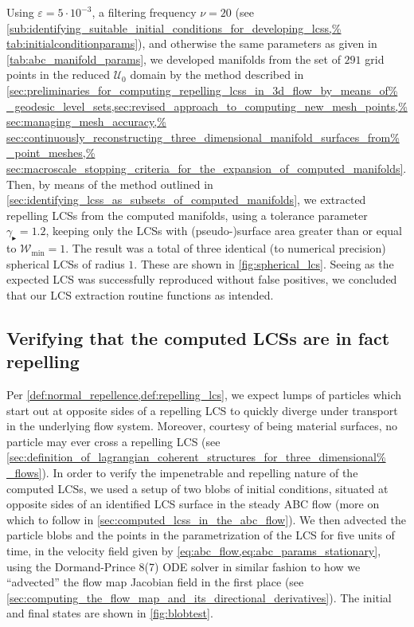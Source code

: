 

Using $\varepsilon=5\cdot10^{-3}$, a filtering frequency $\nu=20$ (see
\cref{sub:identifying_suitable_initial_conditions_for_developing_lcss,%
tab:initialconditionparams}), and otherwise the same parameters as given
in \cref{tab:abc_manifold_params}, we developed manifolds from the set
of $291$ grid points in the reduced $\mathcal{U}_{0}$ domain by the method
described in
\cref{sec:preliminaries_for_computing_repelling_lcss_in_3d_flow_by_means_of%
    _geodesic_level_sets,sec:revised_approach_to_computing_new_mesh_points,%
    sec:managing_mesh_accuracy,%
    sec:continuously_reconstructing_three_dimensional_manifold_surfaces_from%
    _point_meshes,%
    sec:macroscale_stopping_criteria_for_the_expansion_of_computed_manifolds}.
Then, by means of the method outlined in
\cref{sec:identifying_lcss_as_subsets_of_computed_manifolds}, we extracted
repelling LCSs from the computed manifolds, using a tolerance parameter
$\gamma_{\blacktriangleright}=1.2$, keeping only the LCSs with (pseudo-)surface
area greater than or equal to $\mathcal{W}_{\min}=1$. The result was a total of
three identical (to numerical precision) spherical LCSs of radius $1$. These
are shown in \cref{fig:spherical_lcs}. Seeing as the expected LCS was
successfully reproduced without false positives, we concluded that our LCS
extraction routine functions as intended.




\subsection{Verifying that the computed LCSs are in fact repelling}
\label{sub:verifying_that_the_computed_lcss_are_in_fact_repelling}

Per \cref{def:normal_repellence,def:repelling_lcs}, we expect lumps of
particles which start out at opposite sides of a repelling LCS to quickly
diverge under transport in the underlying flow system. Moreover, courtesy
of being material surfaces, no particle may ever cross a repelling LCS (see
\cref{sec:definition_of_lagrangian_coherent_structures_for_three_dimensional%
_flows}). In order to verify the impenetrable and repelling nature of the
computed LCSs, we used a setup of two blobs of initial conditions, situated at
opposite sides of an identified LCS surface in the steady ABC flow (more on
which to follow in \cref{sec:computed_lcss_in_the_abc_flow}). We then advected
the particle blobs and the points in the parametrization of the LCS for five
units of time, in the velocity field given by
\cref{eq:abc_flow,eq:abc_params_stationary}, using the Dormand-Prince 8(7) ODE
solver in similar fashion to how we ``advected'' the flow map Jacobian field in
the first place (see
\cref{sec:computing_the_flow_map_and_its_directional_derivatives}). The initial
and final states are shown in \cref{fig:blobtest}.

